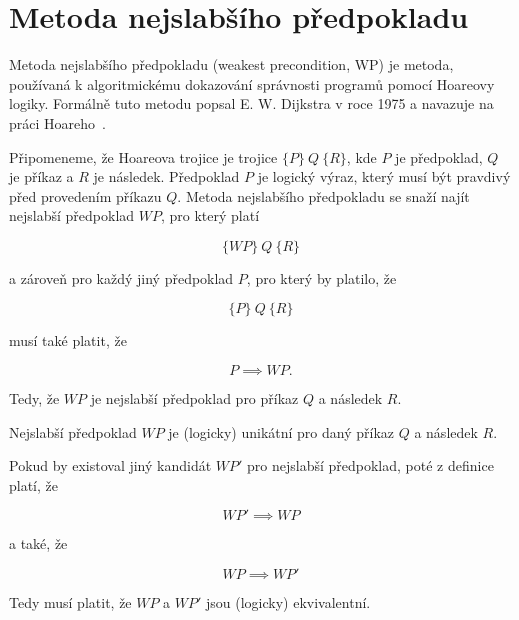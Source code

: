 \chapter{Metoda nejslabšího předpokladu}
\label{ch:metoda-nejslabsiho-predpokladu}

Metoda nejslabšího předpokladu (weakest precondition, WP) je metoda,
používaná k algoritmickému dokazování správnosti programů pomocí Hoareovy logiky.
Formálně tuto metodu popsal E. W. Dijkstra v roce 1975 a navazuje na práci Hoareho~\cite{Dijkstra1975}.

Připomeneme, že Hoareova trojice je trojice $ \{ P \} \ Q \ \{ R \} $,
kde $P$ je předpoklad, $Q$ je příkaz a $R$ je následek.
Předpoklad $P$ je logický výraz, který musí být pravdivý před provedením příkazu $Q$.
Metoda nejslabšího předpokladu se snaží najít nejslabší předpoklad $WP$, pro který platí

\begin{equation*}
    \{ WP \} \ Q \ \{ R \}
\end{equation*}

a zároveň pro každý jiný předpoklad $P$, pro který by platilo, že

\begin{equation*}
    \{ P \} \ Q \ \{ R \}
\end{equation*}

musí také platit, že

\begin{equation*}
    P \implies WP.
\end{equation*}

Tedy, že $WP$ je nejslabší předpoklad pro příkaz $Q$ a následek $R$.

\begin{remark}
    Nejslabší předpoklad $WP$ je (logicky) unikátní pro daný příkaz $Q$ a následek $R$.
\end{remark}

Pokud by existoval jiný kandidát $WP'$ pro nejslabší předpoklad,
poté z definice platí, že

\begin{equation*}
    WP' \implies WP
\end{equation*}

a také, že

\begin{equation*}
    WP \implies WP'
\end{equation*}

Tedy musí platit, že $WP$ a $WP'$ jsou (logicky) ekvivalentní.

